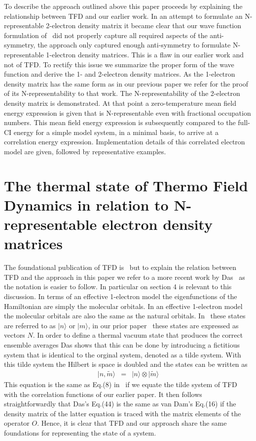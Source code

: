 \documentclass[pra,nofootinbib]{revtex4-1}
\begin{document}
To describe the approach outlined above this paper proceeds by explaining the relationship
between TFD and our earlier work. In an attempt to formulate an N-representable 2-electron
density matrix it became clear that our wave function formulation of~\cite{van_Dam_2016}
did not properly capture all required aspects of the anti-symmetry, the approach
only captured enough anti-symmetry to formulate N-representable 1-electron density
matrices. This is a flaw in our earlier work and not of TFD. To rectify this issue we
summarize the proper form of the wave function and derive the 1- and 2-electron density
matrices. As the 1-electron density matrix has the same form as in our previous paper we
refer for the proof of its N-representability to that work. The N-representability of 
the 2-electron density matrix is demonstrated. At that point a zero-temperature 
mean field energy expression is given that is N-representable even with fractional
occupation numbers. This mean field energy expression is subsequently compared to the 
full-CI energy for a simple model system,  in a minimal basis, to arrive at 
a correlation energy expression. Implementation details of this correlated electron
model are given, followed by representative examples.

\section{The thermal state of Thermo Field Dynamics in relation to N-representable 
         electron density matrices}

The foundational publication of TFD is~\cite{TAKAHASHI_1996} but to explain the relation
between TFD and the approach in this paper we refer to a more recent work by
Das~\cite{das2000topics} as the notation is easier to follow. In particular on section 4
is relevant to this discussion. In terms of 
an effective 1-electron model the eigenfunctions of the Hamiltonian are
simply the molecular orbitals. In an effective 1-electron model the molecular
orbitals are also the same as the natural orbitals. In~\cite{das2000topics} these
states are referred to as $|n\rangle$ or $|m\rangle$, in our prior paper~\cite{van_Dam_2016} 
these states are expressed as vectors $N$. In order to define a thermal vacuum state 
that produces the correct ensemble averages Das shows that this can be done by 
introducing a fictitious system that is identical to the orginal system, denoted as 
a tilde system. With this tilde system the Hilbert is space is doubled and the states
can be written as
\begin{eqnarray}
   |n,\tilde{m}\rangle &=& |n\rangle \otimes |\tilde{m}\rangle
\end{eqnarray}
This equation is the same as Eq.(8) in~\cite{van_Dam_2016} if we equate the tilde 
system of TFD with the correlation functions of our earlier paper. It then follows 
straightforwardly that Das's Eq.(44) is the same as van Dam's Eq.(16) if the density
matrix of the latter equation is traced with the matrix elements of the operator $O$.
Hence, it is clear that TFD and our approach share the same foundations for 
representing the state of a system. 
\end{document}
